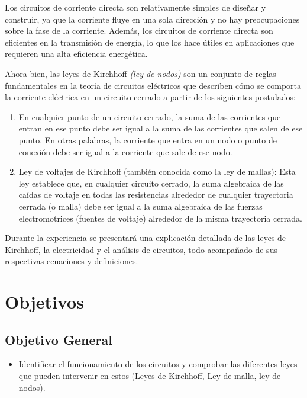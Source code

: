 \documentclass[twocolumn, 12pt]{article}
\begin{document}
Los circuitos de corriente directa son relativamente
simples de diseñar y construir, ya que la corriente fluye
en una sola dirección y no hay preocupaciones sobre la fase
de la corriente. Además, los circuitos de corriente directa
son eficientes en la transmisión de energía, lo que los
hace útiles en aplicaciones que requieren una alta
eficiencia energética.

Ahora bien, las leyes de Kirchhoff \textit{(ley de nodos)}
son un conjunto de reglas fundamentales en la teoría de
circuitos eléctricos que describen cómo se comporta la
corriente eléctrica en un circuito cerrado a partir de los
siguientes postulados:

\begin{enumerate}
	\item En cualquier punto de un circuito cerrado, la suma de las
	      corrientes que entran en ese punto debe ser igual a la suma
	      de las corrientes que salen de ese punto. En otras
	      palabras, la corriente que entra en un nodo o punto de
	      conexión debe ser igual a la corriente que sale de ese
	      nodo.

	\item Ley de voltajes de Kirchhoff (también conocida como la ley
	      de mallas): Esta ley establece que, en cualquier circuito
	      cerrado, la suma algebraica de las caídas de voltaje en
	      todas las resistencias alrededor de cualquier trayectoria
	      cerrada (o malla) debe ser igual a la suma algebraica de
	      las fuerzas electromotrices (fuentes de voltaje) alrededor
	      de la misma trayectoria cerrada.
\end{enumerate}

Durante la experiencia se presentará una explicación
detallada de las leyes de Kirchhoff, la electricidad y el
análisis de circuitos, todo acompañado de sus respectivas
ecuaciones y definiciones.

\section{Objetivos}

\subsection*{Objetivo General}

\begin{itemize}[label=$\triangleright$]
	\item Identificar el funcionamiento de los circuitos y comprobar
	      las diferentes leyes que pueden intervenir en estos (Leyes
	      de Kirchhoff, Ley de malla, ley de nodos).
\end{itemize}
\end{document}
